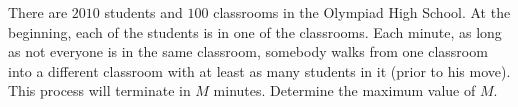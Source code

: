 There are $2010$ students and $100$ classrooms in the Olympiad High School. At the beginning, each of the students is in one of the classrooms. Each minute, as long as not everyone is in the same classroom, somebody walks from one classroom into a different classroom with at least as many students in it (prior to his move). This process will terminate in $M$ minutes. Determine the maximum value of $M$.